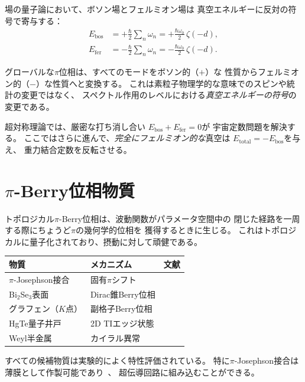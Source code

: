 \documentclass[11pt,a4paper,twocolumn]{article}
\begin{document}
場の量子論において、ボソン場とフェルミオン場は
真空エネルギーに反対の符号で寄与する：
\begin{align}
  E_{\mathrm{bos}} &= +\tfrac{\hbar}{2}\sum_n \omega_n
  = +\tfrac{\hbar\omega_0}{2}\,\zeta(-d), \\
  E_{\mathrm{fer}} &= -\tfrac{\hbar}{2}\sum_n \omega_n
  = -\tfrac{\hbar\omega_0}{2}\,\zeta(-d).
\end{align}

グローバルな$\pi$位相は、すべてのモードをボソン的（$+$）な
性質からフェルミオン的（$-$）な性質へと変換する。
これは素粒子物理学的な意味でのスピンや統計の変更ではなく、
スペクトル作用のレベルにおける\emph{真空エネルギーの符号}の変更である。

超対称理論では、厳密な打ち消し合い
$E_{\mathrm{bos}} + E_{\mathrm{fer}} = 0$が
宇宙定数問題を解決する。
ここではさらに進んで、\emph{完全にフェルミオン的な}真空は
$E_{\mathrm{total}} = -E_{\mathrm{bos}}$を与え、
重力結合定数を反転させる。

\section{$\pi$-Berry位相物質}

トポロジカル$\pi$-Berry位相は、波動関数がパラメータ空間中の
閉じた経路を一周する際にちょうど$\pi$の幾何学的位相を
獲得するときに生じる。
これはトポロジカルに量子化されており、摂動に対して頑健である。

\begin{center}
\begin{tabular}{lll}
\toprule
物質 & メカニズム & 文献 \\
\midrule
$\pi$-Josephson接合 & 固有$\pi$シフト & \cite{Ryazanov2001} \\
Bi$_2$Se$_3$表面 & Dirac錐Berry位相 & \cite{Zhang2009} \\
グラフェン（$K$点） & 副格子Berry位相 & \cite{Novoselov2005} \\
HgTe量子井戸 & 2D TIエッジ状態 & \cite{Koenig2007} \\
Weyl半金属 & カイラル異常 & \cite{Xu2015} \\
\bottomrule
\end{tabular}
\end{center}

すべての候補物質は実験的によく特性評価されている。
特に$\pi$-Josephson接合は薄膜として作製可能であり~\cite{Ryazanov2001}、
超伝導回路に組み込むことができる。
\end{document}
